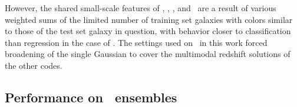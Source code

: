 However, the shared small-scale features of \annz, \metaphor, \cmnn, and \skynet\ are a result of various weighted sums of the limited number of training set galaxies with colors similar to those of the test set galaxy in question, with behavior closer to classification than regression in the case of \annz.
The settings used on \gpz\ in this work forced broadening of the single Gaussian to cover the multimodal redshift solutions of the other codes.

\subsection{Performance on \pzpdf\ ensembles}

